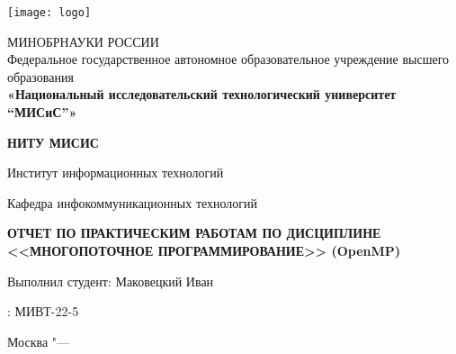 \thispagestyle{empty}

\begin{center}
      \texttt{[image: logo]}
\end{center}
\begin{center}
МИНОБРНАУКИ РОССИИ \\
\smallskip
Федеральное государственное автономное образовательное учреждение
высшего образования
\\
\textbf{«Национальный исследовательский технологический университет “МИСиС”»}
\bigskip

\textbf{\Large НИТУ МИСИС}

\noindent\hrulefill

\smallskip

Институт информационных технологий

Кафедра инфокоммуникационных технологий
\end{center}
%

\vspace{0pt plus1fill} %
\begin{center}
\textbf {\large %
ОТЧЕТ ПО ПРАКТИЧЕСКИМ РАБОТАМ ПО ДИСЦИПЛИНЕ <<МНОГОПОТОЧНОЕ ПРОГРАММИРОВАНИЕ>> (OpenMP)}
\end{center}
\vspace{0pt plus2fill} %
Выполнил студент: Маковецкий Иван

: МИВТ-22-5

\vspace{0pt plus4fill} %
{\centering Москва "--- \thesisYear\par}
